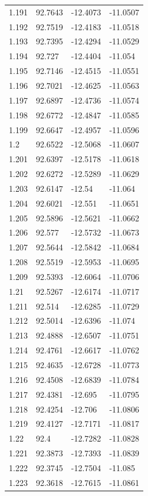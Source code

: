 \begin{tabular}{llll}
1.191 & 92.7643 & -12.4073 & -11.0507 \\
1.192 & 92.7519 & -12.4183 & -11.0518 \\
1.193 & 92.7395 & -12.4294 & -11.0529 \\
1.194 & 92.727 & -12.4404 & -11.054 \\
1.195 & 92.7146 & -12.4515 & -11.0551 \\
1.196 & 92.7021 & -12.4625 & -11.0563 \\
1.197 & 92.6897 & -12.4736 & -11.0574 \\
1.198 & 92.6772 & -12.4847 & -11.0585 \\
1.199 & 92.6647 & -12.4957 & -11.0596 \\
1.2 & 92.6522 & -12.5068 & -11.0607 \\
1.201 & 92.6397 & -12.5178 & -11.0618 \\
1.202 & 92.6272 & -12.5289 & -11.0629 \\
1.203 & 92.6147 & -12.54 & -11.064 \\
1.204 & 92.6021 & -12.551 & -11.0651 \\
1.205 & 92.5896 & -12.5621 & -11.0662 \\
1.206 & 92.577 & -12.5732 & -11.0673 \\
1.207 & 92.5644 & -12.5842 & -11.0684 \\
1.208 & 92.5519 & -12.5953 & -11.0695 \\
1.209 & 92.5393 & -12.6064 & -11.0706 \\
1.21 & 92.5267 & -12.6174 & -11.0717 \\
1.211 & 92.514 & -12.6285 & -11.0729 \\
1.212 & 92.5014 & -12.6396 & -11.074 \\
1.213 & 92.4888 & -12.6507 & -11.0751 \\
1.214 & 92.4761 & -12.6617 & -11.0762 \\
1.215 & 92.4635 & -12.6728 & -11.0773 \\
1.216 & 92.4508 & -12.6839 & -11.0784 \\
1.217 & 92.4381 & -12.695 & -11.0795 \\
1.218 & 92.4254 & -12.706 & -11.0806 \\
1.219 & 92.4127 & -12.7171 & -11.0817 \\
1.22 & 92.4 & -12.7282 & -11.0828 \\
1.221 & 92.3873 & -12.7393 & -11.0839 \\
1.222 & 92.3745 & -12.7504 & -11.085 \\
1.223 & 92.3618 & -12.7615 & -11.0861 \\

\end{tabular}
